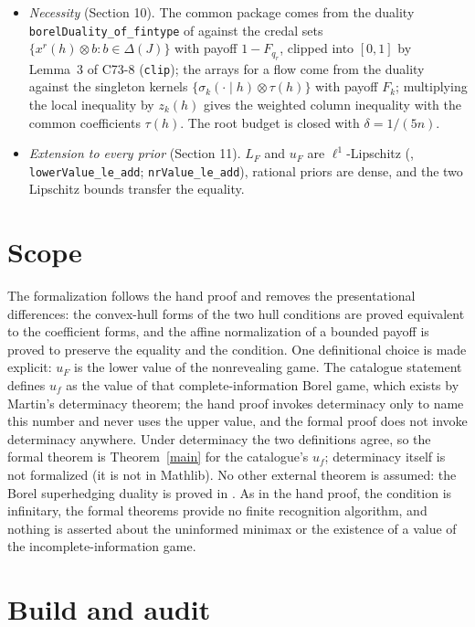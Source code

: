 \documentclass[11pt]{article}
\theoremstyle{definition}
\begin{document}
\begin{itemize}
\item \emph{Necessity} (Section 10). The common package comes from the duality \texttt{borelDuality\_of\_fintype} of \cite{Lean8} against the credal sets $\{x^r(h)\otimes b:b\in\Delta(J)\}$ with payoff $1-F_{q_r}$, clipped into $[0,1]$ by Lemma~3 of C73-8 (\texttt{clip}); the arrays for a flow come from the duality against the singleton kernels $\{\sigma_k(\cdot\mid h)\otimes\tau(h)\}$ with payoff $F_k$; multiplying the local inequality by $z_k(h)$ gives the weighted column inequality with the common coefficients $\tau(h)$. The root budget is closed with $\delta=1/(5n)$.
\item \emph{Extension to every prior} (Section 11). $L_F$ and $u_F$ are $\ell^1$-Lipschitz (\cite{Lean8}, \texttt{lowerValue\_le\_add}; \texttt{nrValue\_le\_add}), rational priors are dense, and the two Lipschitz bounds transfer the equality.
\end{itemize}

\section{Scope}

The formalization follows the hand proof and removes the presentational differences: the convex-hull forms of the two hull conditions are proved equivalent to the coefficient forms, and the affine normalization of a bounded payoff is proved to preserve the equality and the condition. One definitional choice is made explicit: $u_F$ is the lower value of the nonrevealing game. The catalogue statement defines $u_f$ as the value of that complete-information Borel game, which exists by Martin's determinacy theorem; the hand proof invokes determinacy only to name this number and never uses the upper value, and the formal proof does not invoke determinacy anywhere. Under determinacy the two definitions agree, so the formal theorem is Theorem~\ref{main} for the catalogue's $u_f$; determinacy itself is not formalized (it is not in Mathlib). No other external theorem is assumed: the Borel superhedging duality is proved in \cite{Lean8}. As in the hand proof, the condition is infinitary, the formal theorems provide no finite recognition algorithm, and nothing is asserted about the uninformed minimax or the existence of a value of the incomplete-information game.

\section{Build and audit}
\end{document}
